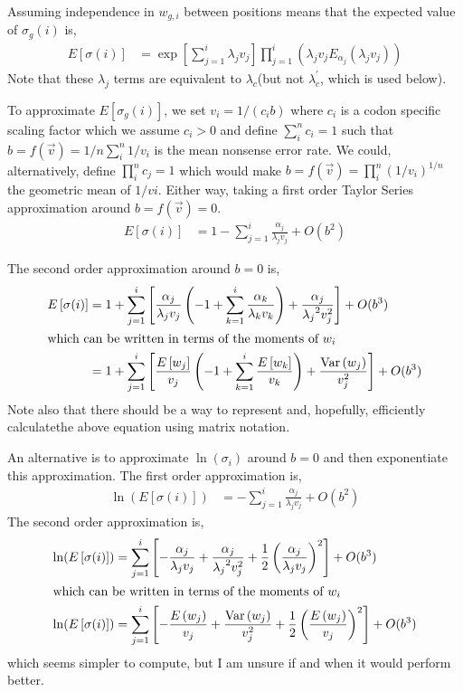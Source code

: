\documentclass{article}
\newcommand{\elongWaitTime}{\ensuremath{w}\xspace}
\newcommand{\wi}{\ensuremath{\elongWaitTime_i}\xspace}
\newcommand{\wj}{\ensuremath{\elongWaitTime_j}\xspace}
\newcommand{\wk}{\ensuremath{\elongWaitTime_k}\xspace}
\newcommand{\wgi}{\ensuremath{\elongWaitTime_{g,i}}\xspace}
\newcommand{\alphaj}{\ensuremath{{\alpha_j}}\xspace}
\newcommand{\alphak}{\ensuremath{{\alpha_k}}\xspace}
\newcommand{\lambdac}{\ensuremath{{\lambda_c}}\xspace}
\newcommand{\lambdacprime}{\ensuremath{{\lambda_c^\prime}}\xspace}
\newcommand{\lambdaj}{\ensuremath{{\lambda_j}}\xspace}
\newcommand{\lambdak}{\ensuremath{{\lambda_k}}\xspace}
\newcommand{\nseWaitTime}{\ensuremath{v}\xspace}
\newcommand{\vi}{\ensuremath{\nseWaitTime_{i}}\xspace}
\newcommand{\vj}{\ensuremath{\nseWaitTime_{j}}\xspace}
\newcommand{\vk}{\ensuremath{\nseWaitTime_{k}}\xspace}
\newcommand{\sigmag}{\ensuremath{\sigma_{g}}\xspace}
\newcommand{\Esigmagi}{\ensuremath{E\left[\sigma_{g}(i)\right]}\xspace}
\newcommand{\Esigmai}{\ensuremath{E\left[\sigma(i)\right]}\xspace}
\newcommand{\Var}{\ensuremath{\text{Var}}\xspace}
\begin{document}
Assuming independence in \wgi between positions means that the expected value of $\sigmag(i)$ is, 
\begin{align}
\label{eq:defESigma}
  \Esigmai &=  \exp\left[\sum_{j=1}^i \lambdaj \vj\right]  \prod_{j=1}^{i}\left(\lambdaj \vj  E_{\alphaj}\left(\lambdaj \vj\right) \right)
\end{align}
Note that these \lambdaj terms are equivalent to \lambdac (but not \lambdacprime, which is used below).

To approximate \Esigmagi, we set $\vi = 1/(c_i b)$ where $c_i$ is a codon specific scaling factor which we assume $c_i>0$ and define $\sum_i^n c_i = 1$ such that $b = f(\vec{v})=  1/n \sum_i^n 1/\vi$ is the mean nonsense error rate.
We could, alternatively, define $\prod_i^n c_j = 1$ which would make $b = f(\vec{v}) =  \prod_i^n (1/\vi)^{1/n}$ the geometric mean of $1/vi$.
Either way, taking a first order Taylor Series approximation around $b= f(\vec{v}) =0$.
\begin{align}
\label{eq:approxESigmag}
  \Esigmai &= 1 - \sum_{j=1}^i \frac{\alphaj}{\lambdaj \vj}+ O(b^2)
\end{align}

The second order approximation around $b=0$ is,
\begin{align}
\label{eq:secondOrderApproxESigmag}
  \Esigmai &= 1 + \sum_{j=1}^i \left[\frac{\alphaj}{\lambdaj \vj} \left(-1+\sum_{k=1}^i\frac{\alphak}{\lambdak \vk} \right)+\frac{\alphaj}{\lambdaj^2 \vj^2}\right] +  O(b^3)\\
\intertext{which can be written in terms of the moments of \wi}
&= 1 + \sum_{j=1}^i \left[\frac{E\left[\wj\right]}{\vj} \left(-1+\sum_{k=1}^i\frac{E\left[\wk\right]}{ \vk} \right)+\frac{\Var\left(\wj\right)}{\vj^2}\right] +  O(b^3)
\end{align}
Note also that there should be a way to represent and, hopefully, efficiently calculatethe above equation using matrix notation.

An alternative is to approximate $\ln(\sigma_i)$ around $b=0$ and then exponentiate this approximation.
The first order approximation is,
\begin{align}
\ln(\Esigmai) &= - \sum_{j=1}^i \frac{\alphaj}{\lambdaj \vj} + O(b^2)
\end{align}
The second order approximation is,
\begin{align}
\ln(\Esigmai) &= \sum_{j=1}^i \left[-\frac{\alphaj}{\lambdaj \vj} + \frac{\alphaj}{\lambdaj^2 \vj^2} + \frac{1}{2} \left(\frac{\alphaj}{\lambdaj \vj}\right)^2\right]+ O(b^3)\\
\intertext{which can be written in terms of the moments of \wi}
\ln(\Esigmai) &= \sum_{j=1}^i \left[-\frac{E\left(\wj\right)}{\vj} + \frac{\Var\left(\wj\right)}{ \vj^2} + \frac{1}{2} \left(\frac{E\left(\wj\right)}{\vj}\right)^2\right]+ O(b^3)
\end{align}
which seems simpler to compute, but I am unsure if and when it would perform better.
\end{document}

